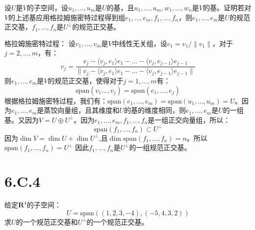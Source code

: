 \documentclass[10pt,a4paper,UTF8]{article}
\begin{document}
\begin{tikzproblem}
设\(U\)是\(V\)的子空间，设\(u_{1},\ldots ,u_{m}\)是\(U\)的基，且\(u_{1},\ldots ,u_{m},w_{1},\ldots ,w_{n}\)是\(V\)的基。证明若对\(V\)的上述基应用格拉姆施密特过程得到组\(e_{1},\ldots ,e_{m},f_{1},\ldots ,f_{n}\)，则\(e_{1},\ldots ,e_{m}\)是\(U\)的规范正交基，\(f_{1},\ldots ,f_{n}\)是\(U^{\bot}\)的规范正交基。
\end{tikzproblem}

\begin{tikzanswer}
格拉姆施密特过程：
设\(v_{1},\ldots ,v_{m}\)是\(V\)中线性无关组，设\(e_{1} = v_{1}/ \| v_{1} \|\)，对于\(j=2,\ldots ,m\)，有：
\begin{equation}
\label{eq:1}
v_{j} = \frac{ v_{j} - \langle v_{j},e_{1} \rangle e_{1} -\ldots - \langle v_{j},e_{j-1} \rangle e_{j-1}  }{ \|  v_{j} - \langle v_{j},e_{1} \rangle e_{1} -\ldots - \langle v_{j},e_{j-1} \rangle e_{j-1} \| }
\end{equation}
则\(e_{1},\ldots ,e_{m}\)是\(V\)的规范正交基，使得对于\(j=1,\ldots ,m\)有：
\begin{equation}
\label{eq:2}
\mathrm{span}(v_{1}\ldots ,v_{j}) = \mathrm{span}(e_{1},\ldots ,e_{j})
\end{equation}
根据格拉姆施密特过程，我们有：\(\mathrm{span}(e_{1},\ldots ,e_{m}) = \mathrm{span}(u_{1},\ldots ,u_{m}) = U\)。因为\(e_{1},\ldots ,e_{m}\)是蒸饺向量组，且其维度和\(U\)的基的维度相同，则\(e_{1},\ldots ,e_{m}\)是\(U\)的一组基。又因为\(V = U\oplus U^{\bot}\)。因为\(e_{1},\ldots ,e_{m},f_{1},\ldots ,f_{n}\)是一组正交向量组，所以：
\begin{equation}
\label{eq:3}
\mathrm{span}(f_{1},\ldots ,f_{n}) \subset U^{\bot}
\end{equation}
因为\(\dim V = \dim U + \dim U^{\bot}\),且\(\dim \mathrm{span}(f_{1},\ldots ,f_{n}) = n\)。所以\(\mathrm{span}(f_{1},\ldots ,f_{n}) = U^{\bot}\)
因此\(f_{1},\ldots ,f_{n}\)是\(U^{\bot}\)的一组规范正交基。
\end{tikzanswer}
\section{6.C.4}
\label{sec:org2df01ea}


\begin{tikzproblem}
给定\(\mathbf{R}^{4}\)的子空间：
\begin{equation}
\label{eq:4}
U = \mathrm{span}((1,2,3,-4),(-5,4,3,2))
\end{equation}
求\(U\)的一个规范正交基和\(U^{\bot}\)的一个规范正交基。
\end{tikzproblem}
\end{document}
